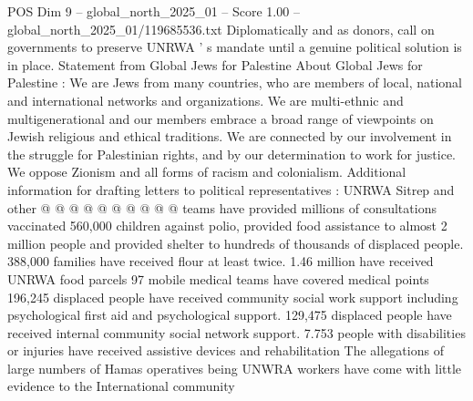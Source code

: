 \begin{textsample}{POS Dim 9 – global\_north\_2025\_01 – Score 1.00 – global\_north\_2025\_01/119685536.txt}
Diplomatically and as donors, call on governments to preserve UNRWA ' s mandate until a genuine political solution is in place.
Statement from Global Jews for Palestine About Global Jews for Palestine : We are Jews from many countries, who are members of local, national and international networks and organizations.
We are multi-ethnic and multigenerational and our members embrace a broad range of viewpoints on Jewish religious and ethical traditions.
We are connected by our involvement in the struggle for Palestinian rights, and by our determination to work for justice.
We oppose Zionism and all forms of racism and colonialism.
Additional information for drafting letters to political representatives : UNRWA Sitrep and other @ @ @ @ @ @ @ @ @ @ teams have provided millions of consultations vaccinated 560,000 children against polio, provided food assistance to almost 2 million people and provided shelter to hundreds of thousands of displaced people. 388,000 families have received flour at least twice. 1.46 million have received UNRWA food parcels 97 mobile medical teams have covered medical points 196,245 displaced people have received community social work support including psychological first aid and psychological support. 129,475 displaced people have received internal community social network support. 7.753 people with disabilities or injuries have received assistive devices and rehabilitation The allegations of large numbers of Hamas operatives being UNWRA workers have come with little evidence to the International community

\end{textsample}
